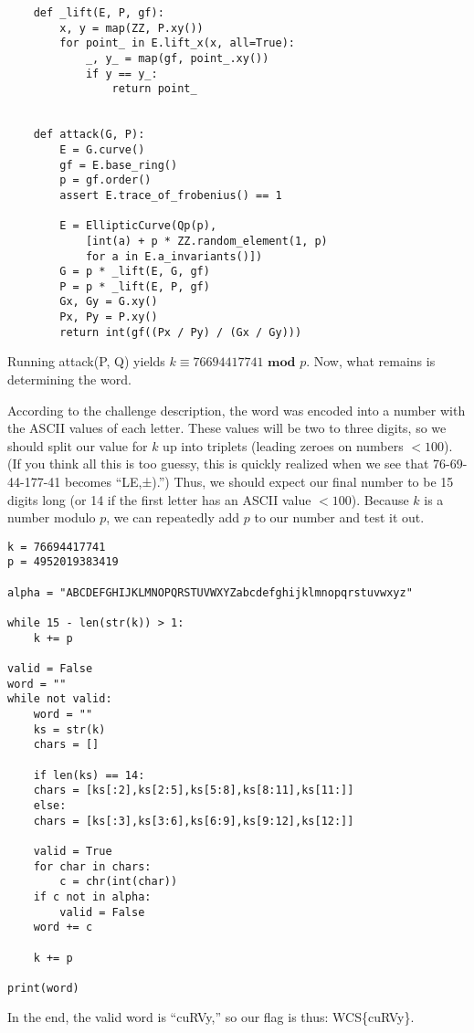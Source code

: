 \documentclass{article}
\begin{document}
\begin{verbatim}
    def _lift(E, P, gf):
        x, y = map(ZZ, P.xy())
        for point_ in E.lift_x(x, all=True):
            _, y_ = map(gf, point_.xy())
            if y == y_:
                return point_


    def attack(G, P):
        E = G.curve()
        gf = E.base_ring()
        p = gf.order()
        assert E.trace_of_frobenius() == 1
    
        E = EllipticCurve(Qp(p),
            [int(a) + p * ZZ.random_element(1, p)
            for a in E.a_invariants()])
        G = p * _lift(E, G, gf)
        P = p * _lift(E, P, gf)
        Gx, Gy = G.xy()
        Px, Py = P.xy()
        return int(gf((Px / Py) / (Gx / Gy)))
\end{verbatim}
Running {\sf attack(P, Q)} yields $k\equiv76694417741\textbf{ mod }p$. Now, what remains is determining the word.

According to the challenge description, the word was encoded into a number with the ASCII values of each letter. These values will be two to three digits, so we should split our value for $k$ up into triplets (leading zeroes on numbers $<100$). (If you think all this is too guessy, this is quickly realized when we see that 76-69-44-177-41 becomes ``LE,±).'') Thus, we should expect our final number to be 15 digits long (or 14 if the first letter has an ASCII value $<100$). Because $k$ is a number modulo $p$, we can repeatedly add $p$ to our number and test it out.
\newpage
\begin{verbatim}
k = 76694417741
p = 4952019383419

alpha = "ABCDEFGHIJKLMNOPQRSTUVWXYZabcdefghijklmnopqrstuvwxyz"

while 15 - len(str(k)) > 1:
    k += p

valid = False
word = ""
while not valid:
    word = ""
    ks = str(k)
    chars = []
	
    if len(ks) == 14:
	chars = [ks[:2],ks[2:5],ks[5:8],ks[8:11],ks[11:]]
    else:
	chars = [ks[:3],ks[3:6],ks[6:9],ks[9:12],ks[12:]]
 
    valid = True
    for char in chars:
        c = chr(int(char))
	if c not in alpha:
		valid = False
	word += c
 
    k += p

print(word)
\end{verbatim}
In the end, the valid word is ``cuRVy,'' so our flag is thus: {\sf WCS\{cuRVy\}}.
\end{document}
